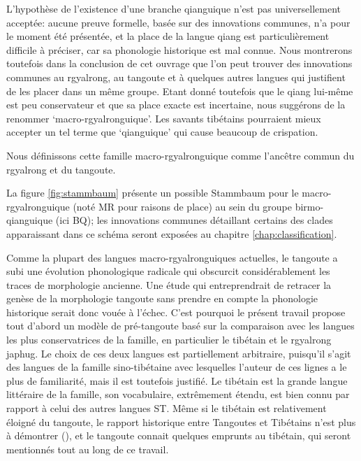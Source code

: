 \documentclass[oldfontcommands,twoside,a4paper,11pt,draft]{memoir}
\begin{document}
L'hypothèse de l'existence d'une branche qianguique n'est pas universellement acceptée: aucune preuve formelle, basée sur des innovations communes, n'a pour le moment été présentée, et la place de la langue qiang est particulièrement difficile à préciser, car sa phonologie historique est mal connue. Nous montrerons toutefois dans la conclusion de cet ouvrage  que l'on peut trouver des innovations communes au rgyalrong, au tangoute et à quelques autres langues qui justifient de les placer dans un même groupe. Etant donné toutefois que le qiang lui-même est peu conservateur et que sa place exacte est incertaine, nous suggérons de la renommer `macro-rgyalronguique'. Les savants tibétains pourraient mieux accepter un tel terme que  `qianguique' qui cause beaucoup de crispation. 


%
\begin{newicktree}
  \small \label{fig:stammbaum}
  \setunitlength{15cm} \righttree \nobranchlengths \nodelabelformat{}
  \par %
\end{newicktree}

Nous définissons cette famille macro-rgyalronguique comme l'ancêtre commun du rgyalrong et du tangoute.

La figure \ref{fig:stammbaum} présente un possible Stammbaum pour le macro-rgyalronguique (noté MR pour raisons de place) au sein du groupe birmo-qianguique (ici BQ); les innovations communes détaillant certains des clades apparaissant dans ce schéma seront exposées au chapitre \ref{chap:classification}.

Comme la plupart des langues macro-rgyalronguiques actuelles,  le tangoute a subi une évolution phonologique radicale qui obscurcit considérablement les traces de morphologie ancienne. Une étude qui entreprendrait de retracer la genèse de la morphologie tangoute sans prendre en compte la phonologie historique serait donc vouée à l'échec. C'est pourquoi le présent travail propose tout d'abord un modèle de pré-tangoute basé sur la comparaison avec les langues les plus conservatrices de la famille, en particulier le tibétain et le rgyalrong japhug. Le choix de ces deux langues est partiellement arbitraire, puisqu'il s'agit des langues de la famille sino-tibétaine avec lesquelles l'auteur de ces lignes a le plus de familiarité, mais il est toutefois justifié. Le tibétain est la grande langue littéraire de la famille, son vocabulaire, extrêmement étendu, est bien connu par rapport à celui des autres langues ST. Même si le tibétain est relativement éloigné du tangoute, le rapport historique entre Tangoutes et Tibétains n'est plus à démontrer (\citealt[137-61]{kychanov68}), et le tangoute connait quelques emprunts au tibétain, qui seront mentionnés tout au long de ce travail.
\end{document}
